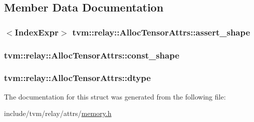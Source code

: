 \subsection{Member Data Documentation}
\subsubsection[{\texorpdfstring{assert\+\_\+shape}{assert_shape}}]{$<${\bf Index\+Expr}$>$ tvm\+::relay\+::\+Alloc\+Tensor\+Attrs\+::assert\+\_\+shape}\hypertarget{structtvm_1_1relay_1_1AllocTensorAttrs_a5ebde62563fb62eefed70239e8a9c818}{}\label{structtvm_1_1relay_1_1AllocTensorAttrs_a5ebde62563fb62eefed70239e8a9c818}
\subsubsection[{\texorpdfstring{const\+\_\+shape}{const_shape}}]{ tvm\+::relay\+::\+Alloc\+Tensor\+Attrs\+::const\+\_\+shape}\hypertarget{structtvm_1_1relay_1_1AllocTensorAttrs_a3a6a06f96895107cce3ed17d85101cee}{}\label{structtvm_1_1relay_1_1AllocTensorAttrs_a3a6a06f96895107cce3ed17d85101cee}
\subsubsection[{\texorpdfstring{dtype}{dtype}}]{ tvm\+::relay\+::\+Alloc\+Tensor\+Attrs\+::dtype}\hypertarget{structtvm_1_1relay_1_1AllocTensorAttrs_a9fd9cdd454c3b0d3d2bf232d22222744}{}\label{structtvm_1_1relay_1_1AllocTensorAttrs_a9fd9cdd454c3b0d3d2bf232d22222744}


The documentation for this struct was generated from the following file\+:\begin{DoxyCompactItemize}
\item 
include/tvm/relay/attrs/\hyperlink{relay_2attrs_2memory_8h}{memory.\+h}\end{DoxyCompactItemize}
